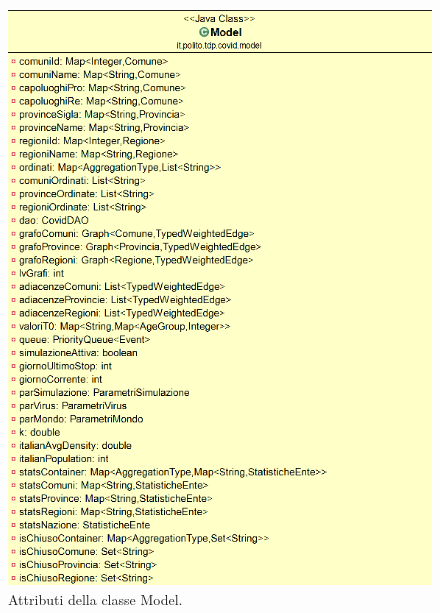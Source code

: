 \documentclass[a4paper, 12pt]{article}
\begin{document}
		\begin{figure}[H]
			\centering
			\includegraphics[width=\linewidth]{IMG/model_1.png}
			\caption[UML attributi modello]{Attributi della classe Model.}
			\label{fig:UMLmodel1}
		\end{figure}
		
\end{document}
